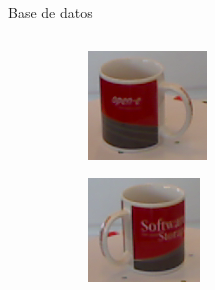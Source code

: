 \documentclass[]{beamer}
\begin{document}
\begin{frame}{Base de datos}
\begin{columns}[t]
\begin{column}{5cm}
\begin{figure}
\begin{subfigure}{1.2cm}
            	\end{subfigure}
                \quad
                \quad
                \quad
                \quad
                \quad
                \quad
            	\begin{subfigure}{1.2cm}
            		\includegraphics[width=\textwidth]{img/base/3.png}
            	\end{subfigure}
            	\begin{subfigure}{1.2cm}
            		\includegraphics[width=\textwidth]{img/base/4.png}
            	\end{subfigure}
            \end{figure}


\end{column}
\end{columns}
\end{frame}
\end{document}
